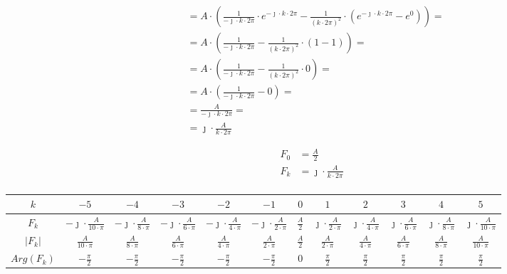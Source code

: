 \begin{task}
\begin{align*}
&=A\cdot \left(\frac{1}{-\jmath \cdot k\cdot 2\pi}\cdot e^{ -\jmath \cdot k \cdot 2\pi} - \frac{1}{\left(k\cdot 2\pi\right)^2}\cdot \left(e^{ -\jmath \cdot k \cdot 2\pi} -e^{ 0} \right) \right)=\\
&=A\cdot \left(\frac{1}{-\jmath \cdot k\cdot 2\pi} - \frac{1}{\left(k\cdot 2\pi\right)^2}\cdot \left( 1 - 1 \right) \right)=\\
&=A\cdot \left(\frac{1}{-\jmath \cdot k\cdot 2\pi} - \frac{1}{\left(k\cdot 2\pi\right)^2}\cdot 0 \right)=\\
&=A\cdot \left(\frac{1}{-\jmath \cdot k\cdot 2\pi} - 0\right)=\\
&=\frac{A}{-\jmath \cdot k\cdot 2\pi}=\\
&=\jmath \cdot \frac{A}{k\cdot 2\pi}
\end{align*}



\begin{align*}
F_0&=\frac{A}{2}\\
F_k&=\jmath \cdot \frac{A}{k\cdot 2\pi}\\
\end{align*}


\begin{table}[H]
  \centering  
  \begin{tabular}{|c|c|c|c|c|c|c|c|c|c|c|c|}
    \hline 
    $k$ & $-5$ & $-4$ & $-3$ & $-2$ & $-1$ & $0$ & $1$ & $2$ & $3$ & $4$ & $5$\\ 
    \hline 
    $F_k$ & $-\jmath\cdot \frac{A}{10\cdot \pi}$ & $-\jmath\cdot \frac{A}{8\cdot \pi}$ & $-\jmath\cdot \frac{A}{6\cdot \pi}$ & $-\jmath\cdot \frac{A}{4\cdot \pi}$ & $-\jmath\cdot \frac{A}{2\cdot \pi}$ & $\frac{A}{2}$ & $\jmath\cdot \frac{A}{2\cdot \pi}$ & $\jmath\cdot \frac{A}{4\cdot \pi}$ & $\jmath\cdot \frac{A}{6\cdot \pi}$ & $\jmath\cdot \frac{A}{8\cdot \pi}$ & $\jmath\cdot \frac{A}{10\cdot \pi}$\\ 
    \hline 
    $\left|F_k\right|$ & $\frac{A}{10\cdot \pi}$ & $\frac{A}{8\cdot \pi}$ & $\frac{A}{6\cdot \pi}$ & $\frac{A}{4\cdot \pi}$ & $\frac{A}{2\cdot \pi}$ & $\frac{A}{2}$ & $\frac{A}{2\cdot \pi}$ & $\frac{A}{4\cdot \pi}$ & $\frac{A}{6\cdot \pi}$ & $\frac{A}{8\cdot \pi}$ & $\frac{A}{10\cdot \pi}$\\ 
    \hline 
    $Arg\left(F_k\right)$ & $-\frac{\pi}{2}$ & $-\frac{\pi}{2}$ & $-\frac{\pi}{2}$ & $-\frac{\pi}{2}$ & $-\frac{\pi}{2}$ & $0$ & $\frac{\pi}{2}$ & $\frac{\pi}{2}$ & $\frac{\pi}{2}$ & $\frac{\pi}{2}$ & $\frac{\pi}{2}$\\ 
    \hline 
  \end{tabular} 
\end{table}


\end{task}
